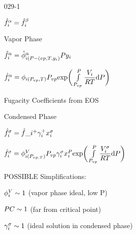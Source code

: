 \begin{mitframe}{029-1}

        
\begin{listone}
	\item$\hat{\fug}_{\state}^{\tdiff}=\hat{\fug}_{\state}^{\texpcoeff}$
\item Vapor Phase
	\begin{listtwo}
              \item$\hat{\fug}_{\state}^{\tdiff}=\hat{\eleccoeff}_{\state(\p-(vp,\Temp,y_{\state})}^{\tdiff}\p{y}_{\state}$
             
              \item $\hat{\fug}_{\state}^{\tdiff}=\eleccoeff_{\state(\p_{vp},\Temp)}\p_{vp}\text{exp}\bigg(\int\limits_{\p_{vp}}^{\p}\dfrac{\vol_{\state}}{\gasconst\Temp}\mathrm{d}\p\bigg)$
              
               			\begin{listthree}
                        \item Fugacity Coefficients from EOS
                        \end{listthree}            


			\end{listtwo}
\item Condensed Phase
	\begin{listtwo}

        	\item $\hat{\fug}_{\state}^{\molecrad}=\hat{\fug}\_{\state}^{+}\actcoeff^{+}\specfrac{i}^{\molecrad}$
            \item $\hat{\fug}_{\state}^{\molecrad}=\eleccoeff_{\state(\p_{vp, \Temp})}^{\vol}\p_{vp}\actcoeff^{\molecrad}\specfrac{i}^{\p}\text{exp}\bigg(\int\limits_{\p_{vp}}^{\p}\dfrac{\vol_{\state}^{\molecrad}}{\gasconst\Temp}\mathrm{d}\p\bigg)$
            
            			\begin{listthree}
                        \item POSSIBLE Simplifications:
                        
                        		\begin{listfour}
                                \item $\eleccoeff_{\state}^{\vol}\sim{1}$  (vapor phase ideal, low P)
                                \item $\p\conc\sim{1}$ (far from critical point)
                                \item$\actcoeff^{\molecrad}\sim{1}$ (ideal solution in condensed phase)
                                
								\end{listfour}
						\end{listthree}
	\end{listtwo}
\end{listone}

\end{mitframe}